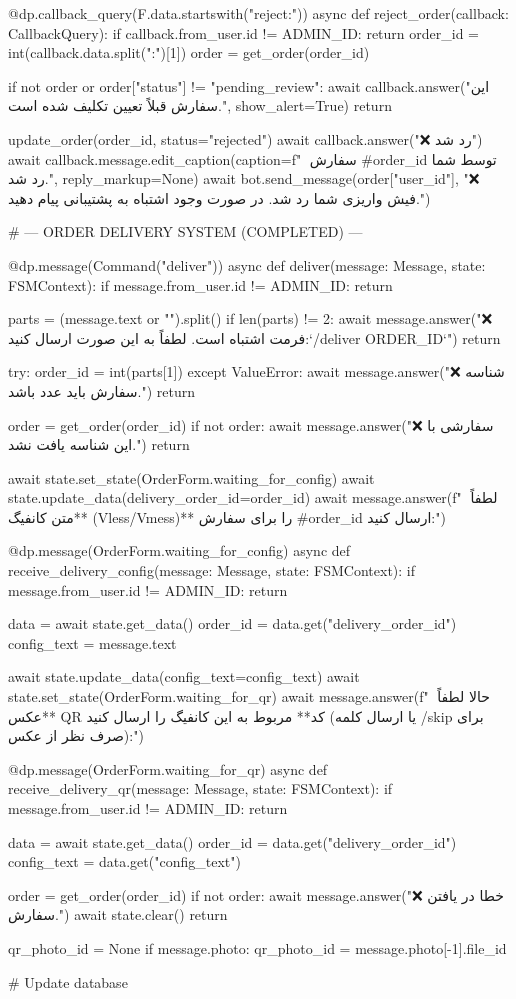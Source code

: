 @dp.callback_query(F.data.startswith("reject:"))
async def reject_order(callback: CallbackQuery):
    if callback.from_user.id != ADMIN_ID:
        return
    order_id = int(callback.data.split(":")[1])
    order = get_order(order_id)

    if not order or order["status"] != "pending_review":
        await callback.answer("این سفارش قبلاً تعیین تکلیف شده است.", show_alert=True)
        return

    update_order(order_id, status="rejected")
    await callback.answer("❌ رد شد")
    await callback.message.edit_caption(caption=f"🔴 سفارش #{order_id} توسط شما رد شد.", reply_markup=None)
    await bot.send_message(order["user_id"], "❌ فیش واریزی شما رد شد. در صورت وجود اشتباه به پشتیبانی پیام دهید.")

# --- ORDER DELIVERY SYSTEM (COMPLETED) ---

@dp.message(Command("deliver"))
async def deliver(message: Message, state: FSMContext):
    if message.from_user.id != ADMIN_ID:
        return
    
    parts = (message.text or "").split()
    if len(parts) != 2:
        await message.answer("❌ فرمت اشتباه است. لطفاً به این صورت ارسال کنید:\n`/deliver ORDER_ID`")
        return

    try:
        order_id = int(parts[1])
    except ValueError:
        await message.answer("❌ شناسه سفارش باید عدد باشد.")
        return

    order = get_order(order_id)
    if not order:
        await message.answer("❌ سفارشی با این شناسه یافت نشد.")
        return

    await state.set_state(OrderForm.waiting_for_config)
    await state.update_data(delivery_order_id=order_id)
    await message.answer(f"🔗 لطفاً **متن کانفیگ (Vless/Vmess)** را برای سفارش #{order_id} ارسال کنید:")

@dp.message(OrderForm.waiting_for_config)
async def receive_delivery_config(message: Message, state: FSMContext):
    if message.from_user.id != ADMIN_ID:
        return

    data = await state.get_data()
    order_id = data.get("delivery_order_id")
    config_text = message.text

    await state.update_data(config_text=config_text)
    await state.set_state(OrderForm.waiting_for_qr)
    await message.answer(f"📸 حالا لطفاً **عکس QR کد** مربوط به این کانفیگ را ارسال کنید (یا ارسال کلمه /skip برای صرف نظر از عکس):")

@dp.message(OrderForm.waiting_for_qr)
async def receive_delivery_qr(message: Message, state: FSMContext):
    if message.from_user.id != ADMIN_ID:
        return

    data = await state.get_data()
    order_id = data.get("delivery_order_id")
    config_text = data.get("config_text")
    
    order = get_order(order_id)
    if not order:
        await message.answer("❌ خطا در یافتن سفارش.")
        await state.clear()
        return

    qr_photo_id = None
    if message.photo:
        qr_photo_id = message.photo[-1].file_id

    # Update database
